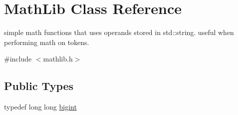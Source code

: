 \hypertarget{class_math_lib}{\section{Math\-Lib Class Reference}
\label{class_math_lib}
}


simple math functions that uses operands stored in std\-::string. useful when performing math on tokens.  




{\ttfamily \#include $<$mathlib.\-h$>$}

\subsection*{Public Types}
\begin{DoxyCompactItemize}
\item 
typedef long long \hyperlink{class_math_lib_aea370b3be964c5704b6244d757fcac99}{bigint}
\end{DoxyCompactItemize}
